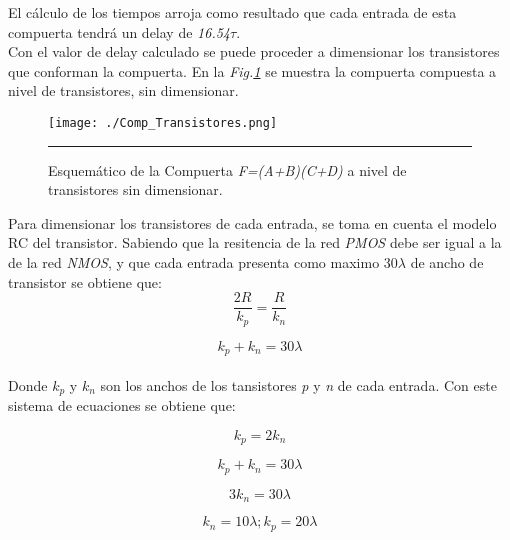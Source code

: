 \documentclass[12pt,a4paper]{article} %
\begin{document}
El cálculo de los tiempos arroja como resultado que cada entrada de esta compuerta tendrá un delay de \textit{16.54$\tau$}.\\

Con el valor de delay calculado se puede proceder a dimensionar los transistores que conforman la compuerta. En la \textit{Fig.\ref{fig:Comp_Transistores}} se muestra la compuerta compuesta a nivel de transistores, sin dimensionar.\\

\begin{figure}[htbp]
  \centering
    \texttt{[image: ./Comp\_Transistores.png]}
    \rule{35em}{0.5pt}
  \caption[IdealvsSim]{Esquemático de la Compuerta \textit{F=(A+B)(C+D)} a nivel de transistores sin dimensionar.}
  \label{fig:Comp_Transistores}
\end{figure}

Para dimensionar los transistores de cada entrada, se toma en cuenta el modelo RC del transistor. Sabiendo que la resitencia de la red \textit{PMOS} debe ser igual a la de la red \textit{NMOS}, y que cada entrada presenta como maximo 30$\lambda$ de ancho de transistor se obtiene que:\\

\begin{equation}\label{eqn:R}
\frac{2R}{k_p} = \frac{R}{k_n}
\end{equation}

\begin{equation}\label{eqn:k}
k_p + k_n = 30\lambda
\end{equation}\\

Donde \textit{$k_{p}$} y \textit{$k_{n}$} son los anchos de los tansistores \textit{p} y \textit{n} de cada entrada. Con este sistema de ecuaciones se obtiene que:

\begin{equation}\label{eqn:R1}
k_p = 2k_n
\end{equation}

\begin{equation}\label{eqn:k1}
k_p + k_n = 30\lambda
\end{equation}

\begin{equation}\label{eqn:k2}
3k_n = 30\lambda
\end{equation}

\begin{equation}\label{eqn:k3}
k_n = 10\lambda ; k_p = 20\lambda
\end{equation}\\
\end{document}
